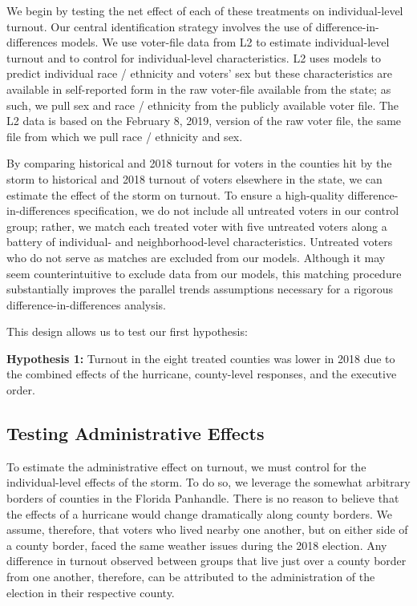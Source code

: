 \documentclass[
  12pt,
]{article}
\begin{document}
We begin by testing the net effect of each of these treatments on individual-level turnout. Our central identification strategy involves the use of difference-in-differences models. We use voter-file data from L2 to estimate individual-level turnout and to control for individual-level characteristics. L2 uses models to predict individual race / ethnicity and voters' sex but these characteristics are available in self-reported form in the raw voter-file available from the state; as such, we pull sex and race / ethnicity from the publicly available voter file. The L2 data is based on the February 8, 2019, version of the raw voter file, the same file from which we pull race / ethnicity and sex.

By comparing historical and 2018 turnout for voters in the counties hit by the storm to historical and 2018 turnout of voters elsewhere in the state, we can estimate the effect of the storm on turnout. To ensure a high-quality difference-in-differences specification, we do not include all untreated voters in our control group; rather, we match each treated voter with five untreated voters along a battery of individual- and neighborhood-level characteristics. Untreated voters who do not serve as matches are excluded from our models. Although it may seem counterintuitive to exclude data from our models, this matching procedure substantially improves the parallel trends assumptions necessary for a rigorous difference-in-differences analysis.

This design allows us to test our first hypothesis:

\textbf{Hypothesis 1:} Turnout in the eight treated counties was lower in 2018 due to the combined effects of the hurricane, county-level responses, and the executive order.

\hypertarget{testing-administrative-effects}{%
\subsection*{Testing Administrative Effects}\label{testing-administrative-effects}}

To estimate the administrative effect on turnout, we must control for the individual-level effects of the storm. To do so, we leverage the somewhat arbitrary borders of counties in the Florida Panhandle. There is no reason to believe that the effects of a hurricane would change dramatically along county borders. We assume, therefore, that voters who lived nearby one another, but on either side of a county border, faced the same weather issues during the 2018 election. Any difference in turnout observed between groups that live just over a county border from one another, therefore, can be attributed to the administration of the election in their respective county.
\end{document}
